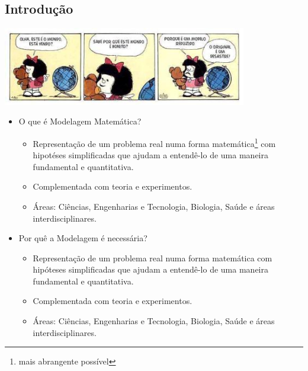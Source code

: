 \documentclass[]{beamer}
\begin{document}
\subsection{Introdução}
\begin{frame}{\insertsection}{\insertsubsection}
\begin{center}
\includegraphics[width=0.8\textwidth]{./img/mafalda-e-o-mundo-desastre}
\end{center}
\end{frame}
\begin{frame}{\insertsection}{\insertsubsection}
\begin{itemize}
\item O que é Modelagem Matemática?

\begin{itemize}
 \item Representação de um problema real numa forma matemática\footnote{mais abrangente possível} com hipotéses simplificadas que ajudam a entendê-lo de  uma maneira fundamental e quantitativa.
 \item Complementada com teoria e experimentos.
 \item Áreas: Ciências, Engenharias e Tecnologia, Biologia, Saúde e áreas interdisciplinares.
\end{itemize}
\end{itemize}
\end{frame}
\begin{frame}{\insertsection}{\insertsubsection}
\begin{itemize}
\item Por quê a Modelagem é necessária?

\begin{itemize}
 \item Representação de um problema real numa forma matemática com hipóteses simplificadas que ajudam a entendê-lo de  uma maneira fundamental e quantitativa.
 \item Complementada com teoria e experimentos.
 \item Áreas: Ciências, Engenharias e Tecnologia, Biologia, Saúde e áreas interdisciplinares.
\end{itemize}
\end{itemize}

\end{frame}
\end{document}
